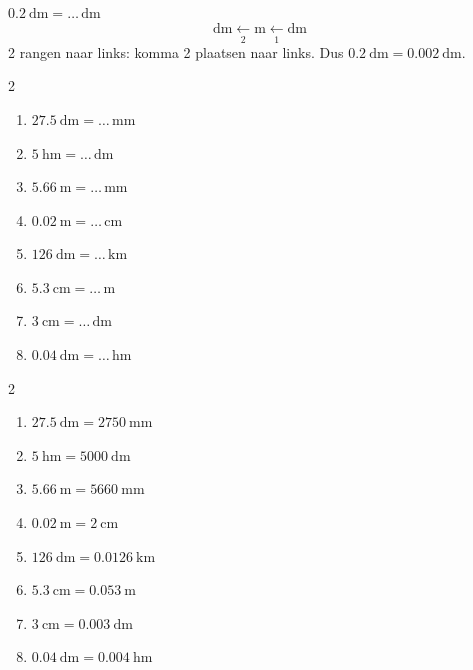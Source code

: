 \documentclass{bis}
\begin{document}
\begin{voorbeeld}
\(\SI{0.2}{\deci\metre}=\ldots\,\si{\deca\metre}\)
\[
\si{\deca\metre}\xleftarrow[2]{}\si{\metre}\xleftarrow[1]{}\si{\deci\metre}
\]
2 rangen naar links: komma 2 plaatsen naar links. Dus \(\SI{0.2}{\deci\metre}=\SI{0.002}{\deca\metre}\).
\end{voorbeeld}

\begin{exercise}
\begin{multicols}{2}
\begin{enumerate}
  \item \(\SI{27.5}{\deci\metre}=\ldots\,\si{\milli\metre}\)
  \item \(\SI{5}{\hecto\metre}=\ldots\,\si{\deci\metre}\)
  \item \(\SI{5.66}{\metre}=\ldots\,\si{\milli\metre}\)
  \item \(\SI{0.02}{\metre}=\ldots\,\si{\centi\metre}\)
  \item \(\SI{126}{\deci\metre}=\ldots\,\si{\kilo\metre}\)
  \item \(\SI{5.3}{\centi\metre}=\ldots\,\si{\metre}\)
  \item \(\SI{3}{\centi\metre}=\ldots\,\si{\deca\metre}\)
  \item \(\SI{0.04}{\deca\metre}=\ldots\,\si{\hecto\metre}\)
\end{enumerate}
\end{multicols}
\end{exercise}

\begin{solution}
\begin{multicols}{2}
\begin{enumerate}
  \item \(\SI{27.5}{\deci\metre}=\SI{2750}{\milli\metre}\)
  \item \(\SI{5}{\hecto\metre}=\SI{5000}{\deci\metre}\)
  \item \(\SI{5.66}{\metre}=\SI{5660}{\milli\metre}\)
  \item \(\SI{0.02}{\metre}=\SI{2}{\centi\metre}\)
  \item \(\SI{126}{\deci\metre}=\SI{0.0126}{\kilo\metre}\)
  \item \(\SI{5.3}{\centi\metre}=\SI{0.053}{\metre}\)
  \item \(\SI{3}{\centi\metre}=\SI{0.003}{\deca\metre}\)
  \item \(\SI{0.04}{\deca\metre}=\SI{0.004}{\hecto\metre}\)
\end{enumerate}
\end{multicols}
\end{solution}
\end{document}
